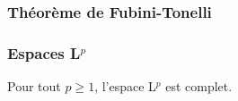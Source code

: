 \bp[de transport]
\ep

\subsubsection{Théorème de Fubini-Tonelli}

\subsubsection{Espaces L$^p$}

\ep

\ep

\bp
Pour tout $p \geq 1$, l'espace L$^p$ est complet.
\ep


    
    
    
    
    
    
    
    
    
    
    
    
    
    
    

